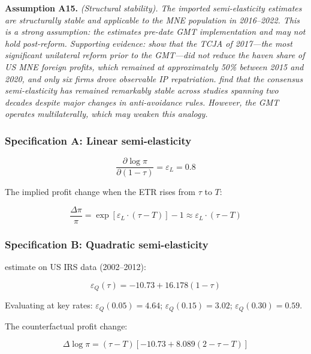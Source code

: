 \documentclass[11pt,a4paper]{article}
\newcommand{\assumption}[2]{\noindent\textbf{Assumption #1.} \textit{#2}\medskip}
\begin{document}
\assumption{A15}{(Structural stability). The imported semi-elasticity estimates are structurally stable and applicable to the MNE population in 2016--2022. This is a strong assumption: the estimates pre-date GMT implementation and may not hold post-reform. Supporting evidence: \citet{garcia-bernardo2022a} show that the TCJA of 2017---the most significant unilateral reform prior to the GMT---did not reduce the haven share of US MNE foreign profits, which remained at approximately 50\% between 2015 and 2020, and only six firms drove observable IP repatriation. \citet{beer2020} find that the consensus semi-elasticity has remained remarkably stable across studies spanning two decades despite major changes in anti-avoidance rules. However, the GMT operates multilaterally, which may weaken this analogy.}

\subsubsection{Specification A: Linear semi-elasticity}

\begin{equation}\label{eq:linear_se}
\frac{\partial \log \pi}{\partial (1-\tau)} = \varepsilon_L = 0.8
\end{equation}

The implied profit change when the ETR rises from $\tau$ to $T$:

\begin{equation}\label{eq:linear_response}
\frac{\Delta \pi}{\pi} = \exp\!\left[\varepsilon_L \cdot (\tau - T)\right] - 1 \approx \varepsilon_L \cdot (\tau - T)
\end{equation}

\subsubsection{Specification B: Quadratic semi-elasticity}

\citet{dowd2017} estimate on US IRS data (2002--2012):

\begin{equation}\label{eq:dowd_se}
\varepsilon_Q(\tau) = -10.73 + 16.178(1-\tau)
\end{equation}

Evaluating at key rates: $\varepsilon_Q(0.05) = 4.64$; $\varepsilon_Q(0.15) = 3.02$; $\varepsilon_Q(0.30) = 0.59$.

The counterfactual profit change:

\begin{equation}\label{eq:dowd_response}
\Delta \log \pi = (\tau - T)\left[-10.73 + 8.089(2 - \tau - T)\right]
\end{equation}
\end{document}

